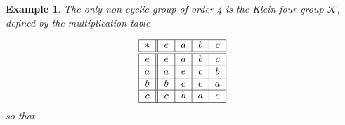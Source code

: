 \documentclass{article}
\newtheorem{example}[theorem]{Example}
\begin{document}
\begin{example}
\label{Example Dist for Klein group}The only non-cyclic group of order 4 is
the Klein four-group $\mathcal{K}$, defined by the multiplication table
%

\begin{equation}
\begin{tabular}{|c||c|c|c|c|}
\hline
$\ast $ & $e$ & $a$ & $b$ & $c$ \\ \hline\hline
$e$ & $e$ & $a$ & $b$ & $c$ \\ \hline
$a$ & $a$ & $e$ & $c$ & $b$ \\ \hline
$b$ & $b$ & $c$ & $e$ & $a$ \\ \hline
$c$ & $c$ & $b$ & $a$ & $e$ \\ \hline
\end{tabular}
\label{TableK}
\end{equation}%
so that 


\end{example}
\end{document}
